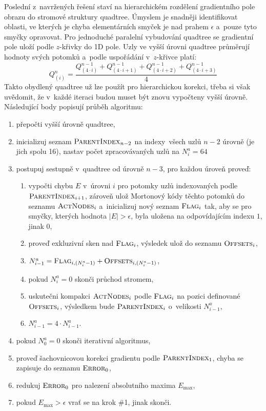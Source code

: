 \documentclass[11pt,a4paper,oneside]{article}
\begin{document}
	Poslední z~navržených řešení staví na hierarchickém rozdělení gradientního pole obrazu do
	stromové struktury quadtree. Úmyslem je snadněji identifikovat oblasti, ve kterých je
	chyba elementárních smyček je nad prahem $\epsilon$ a~pouze tyto smyčky opravovat. Pro jednoduché paralelní
	vybudování quadtree se gradientní pole uloží podle $z$-křivky do 1D pole. Uzly ve vyšší
	úrovni quadtree průměrují hodnoty svých potomků a~podle uspořádání v~$z$-křivce platí:
	\begin{equation}	
		Q_{(i)}^n = \frac{Q_{(4 \cdot i)}^{n - 1} + Q_{(4 \cdot i + 1)}^{n - 1} +
		                  Q_{(4 \cdot i + 2)}^{n - 1} + Q_{(4 \cdot i + 3)}^{n - 1}}{4}
		\label{eq:avg}
	\end{equation}
	Takto obydlený quadtree už lze použít pro hierarchickou korekci, třeba si však uvědomit,
	že v~každé iteraci budou muset být znovu vypočteny vyšší úrovně. Následující body popisují
	průběh algoritmu:
	\begin{enumerate}
		\item přepočti vyšší úrovně quadtree,
		\item inicializuj seznam $\textsc{ParentIndex}_{n - 2}$ na indexy~všech uzlů $n - 2$ úrovně (je jich spolu 16),
		      nastav počet zpracovávaných uzlů na $N_i^a = 64$
		\item postupuj sestupně v~quadtree od úrovně $n - 3$, pro každou úroveň proveď:
		\begin{enumerate}
			\item vypočti chybu $E$ v~úrovni $i$ pro potomky uzlů indexovaných podle $\textsc{ParentIndex}_{i + 1}$,
			      zároveň ulož Mortonový kódy těchto potomků do seznamu $\textsc{ActNodes}_i$ a~inicializuj
			      nový seznam $\textsc{Flag}_i$ tak, aby se pro smyčky, kterých hodnota $|E| > \epsilon$, byla
			      uložena na odpovídajícím indexu $1$, jinak $0$,
			\item proveď exkluzivní sken nad $\textsc{Flag}_i$, výsledek ulož do seznamu $\textsc{Offsets}_i$,
			\item $N_{i - 1}^a = \textsc{Flag}_{i, (N_i^a - 1)} + \textsc{Offsets}_{i, (N_i^a - 1)}$,
			\item pokud $N_i^a = 0$ skonči průchod stromem,
			\item uskutečni kompakci $\textsc{ActNodes}_i$ podle $\textsc{Flag}_i$ na pozici definované $\textsc{Offsets}_i$,
			      výsledkem bude $\textsc{ParentIndex}_i$ o~velikosti $N_{i - 1}^a$,
			\item $N_{i - 1}^a = 4 \cdot N_{i - 1}^a$.
		\end{enumerate}
		\item pokud $N_0^a = 0$ skonči iterativní algoritmus,
		\item proveď šachovnicovou korekci gradientu podle $\textsc{ParentIndex}_1$,
		      chyba se zapisuje do seznamu $\textsc{Error}_0$,
		\item redukuj $\textsc{Error}_0$ pro nalezení absolutního maxima $E_{\max}$,
		\item pokud $E_{\max} > \epsilon$ vrať se na krok \#1, jinak skonči.
	\end{enumerate}
\end{document}
